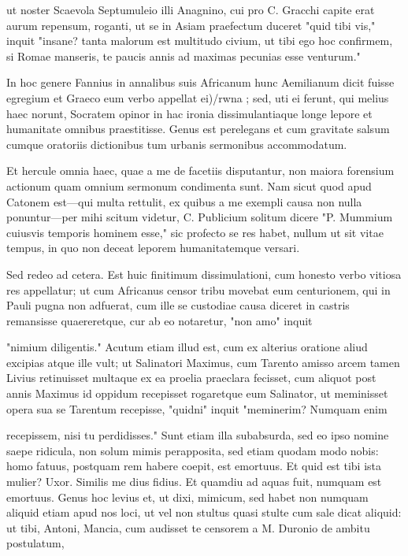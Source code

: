  ut noster Scaevola Septumuleio illi Anagnino, cui pro C. Gracchi capite erat aurum repensum, roganti, ut se in Asiam praefectum duceret "quid tibi vis," inquit "insane? tanta malorum est multitudo civium, ut tibi ego hoc confirmem, si Romae manseris, te paucis annis ad maximas pecunias esse venturum."

 In hoc genere Fannius in annalibus suis Africanum hunc Aemilianum dicit fuisse egregium et Graeco eum verbo appellat ei)/rwna ; sed, uti ei ferunt, qui melius haec norunt, Socratem opinor in hac ironia dissimulantiaque longe lepore et humanitate omnibus praestitisse. Genus est perelegans et cum gravitate salsum cumque oratoriis dictionibus tum urbanis sermonibus accommodatum.

 Et hercule omnia haec, quae a me de facetiis disputantur, non maiora forensium actionum quam omnium sermonum condimenta sunt. Nam sicut quod apud Catonem est—qui multa rettulit, ex quibus a me exempli causa non nulla ponuntur—per mihi scitum videtur, C. Publicium solitum dicere "P. Mummium cuiusvis temporis hominem esse," sic profecto se res habet, nullum ut sit vitae tempus, in quo non deceat leporem humanitatemque versari.

 Sed redeo ad cetera. Est huic finitimum dissimulationi, cum honesto verbo vitiosa res appellatur; ut cum Africanus censor tribu movebat eum centurionem, qui in Pauli pugna non adfuerat, cum ille se custodiae causa diceret in castris remansisse quaereretque, cur ab eo notaretur, "non amo" inquit

 "nimium diligentis." Acutum etiam illud est, cum ex alterius oratione aliud excipias atque ille vult; ut Salinatori Maximus, cum Tarento amisso arcem tamen Livius retinuisset multaque ex ea proelia praeclara fecisset, cum aliquot post annis Maximus id oppidum recepisset rogaretque eum Salinator, ut meminisset opera sua se Tarentum recepisse, "quidni" inquit "meminerim? Numquam enim

 recepissem, nisi tu perdidisses." Sunt etiam illa subabsurda, sed eo ipso nomine saepe ridicula, non solum mimis perapposita, sed etiam quodam modo nobis: homo fatuus, postquam rem habere coepit, est emortuus. Et quid est tibi ista mulier? Uxor. Similis me dius fidius. Et quamdiu ad aquas fuit, numquam est emortuus. Genus hoc levius et, ut dixi, mimicum, sed habet non numquam aliquid etiam apud nos loci, ut vel non stultus quasi stulte cum sale dicat aliquid: ut tibi, Antoni, Mancia, cum audisset te censorem a M. Duronio de ambitu postulatum,

